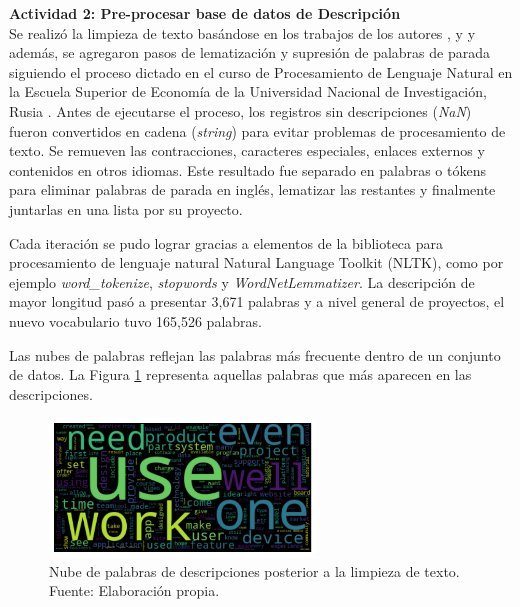 \textbf{Actividad 2: Pre-procesar base de datos de Descripción}
\\
Se realizó la limpieza de texto basándose en los trabajos de los autores \cite{pr_mitra2014phrases}, \cite{pr_yuan2016textanalytics} y \cite{pr_chen2019keywords_crowdfunding} y además, se agregaron pasos de lematización y supresión de palabras de parada siguiendo el proceso dictado en el curso de Procesamiento de Lenguaje Natural en la Escuela Superior de Economía de la Universidad Nacional de Investigación, Rusia \parencite{tec_zimovnov2018text_preprocessing}. Antes de ejecutarse el proceso, los registros sin descripciones (\textit{NaN}) fueron convertidos en cadena (\textit{string}) para evitar problemas de procesamiento de texto. Se remueven las contracciones, caracteres especiales, enlaces externos y contenidos en otros idiomas. Este resultado fue separado en palabras o tókens para eliminar palabras de parada en inglés, lematizar las restantes y finalmente juntarlas en una lista por su proyecto.

Cada iteración se pudo lograr gracias a elementos de la biblioteca para procesamiento de lenguaje natural Natural Language Toolkit (NLTK), como por ejemplo \textit{word\_tokenize}, \textit{stopwords} y \textit{WordNetLemmatizer}. La descripción de mayor longitud pasó a presentar 3,671 palabras y a nivel general de proyectos, el nuevo vocabulario tuvo 165,526 palabras.

Las nubes de palabras reflejan las palabras más frecuente dentro de un conjunto de datos. La Figura \ref{4:fig24} representa aquellas palabras que más aparecen en las descripciones.

\begin{figure}[!ht]
	\begin{center}
		\includegraphics[width=0.63\textwidth]{4/figures/description_wordcloud.png}
		\caption[Nube de palabras de descripciones posterior a la limpieza de texto]{Nube de palabras de descripciones posterior a la limpieza de texto.\\
			Fuente: Elaboración propia.}
		\label{4:fig24}
	\end{center}
\end{figure}

